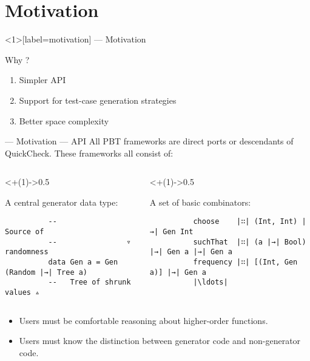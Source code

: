 \section{Motivation}

\begin{frame}<1>[label=motivation]{\halcheck{} --- Motivation}
  \begin{block}{Why \halcheck?}
    \begin{enumerate}
      \item<alert@1> Simpler API
      \item<alert@2> Support for test-case generation strategies
      \item<alert@3> Better space complexity
    \end{enumerate}
  \end{block}
\end{frame}

\begin{frame}[fragile]{\halcheck{} --- Motivation --- API}
  All PBT frameworks are direct ports or descendants of QuickCheck. These frameworks all consist of:

  \bigskip{}

  \begin{columns}
    \begin{column}<+(1)->{0.5\textwidth}
      \begin{block}{A central generator data type:}
        \begin{verbatim}
          --                  Source of
          --                ▿ randomness
          data Gen a = Gen (Random |→| Tree a)
          --   Tree of shrunk values ▵
        \end{verbatim}
      \end{block}
    \end{column}

    \begin{column}<+(1)->{0.5\textwidth}
      \begin{block}{A set of basic combinators:}
        \begin{verbatim}
          choose    |∷| (Int, Int) |→| Gen Int
          suchThat  |∷| (a |→| Bool) |→| Gen a |→| Gen a
          frequency |∷| [(Int, Gen a)] |→| Gen a
          |\ldots|
        \end{verbatim}
      \end{block}
    \end{column}
  \end{columns}

  \pause{}

  \bigskip{}

  \begin{itemize}
    \item Users must be comfortable reasoning about higher-order functions.
    \item Users must know the distinction between \alert{generator code} and \alert{non-generator code}.
  \end{itemize}
\end{frame}

